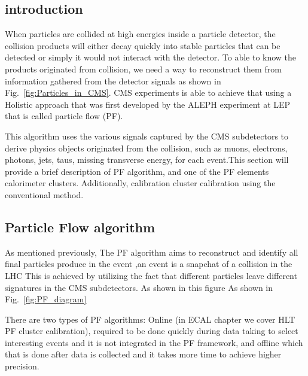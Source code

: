 \subsection{introduction}
When particles are collided at high energies inside a particle detector, the collision products will either decay quickly into stable particles that can be detected or simply it would not interact with the detector. To able to know the products originated from collision, we need a way to reconstruct them from information gathered from the detector signals as shown in Fig.~\ref{fig:Particles_in_CMS}. 
CMS experiments is able to achieve that using a Holistic approach that was first developed by the ALEPH experiment at LEP that is called particle flow (PF).

This algorithm uses the various signals captured by the CMS subdetectors to derive physics objects originated from the collision, such as muons, electrons, photons, jets, taus, missing transverse energy, for each event.This section will provide a brief description of PF algorithm, and one of the PF elements calorimeter clusters. Additionally, calibration cluster calibration using the conventional method. %

\subsection{Particle Flow algorithm}
As mentioned previously, The PF algorithm aims to reconstruct and identify all final particles produce in the event ,an event is a snapchat of a collision in the LHC %
This is achieved by utilizing the fact that different particles leave different signatures in the CMS subdetectors. As shown in this figure As shown in Fig.~\ref{fig:PF_diagram}

There are two types of PF algorithms: Online (in ECAL chapter we cover HLT PF cluster calibration), required to be done quickly during data taking to select interesting events and it is not integrated in the PF framework, and offline which that is done after data is collected and it takes more time to achieve higher precision. %

